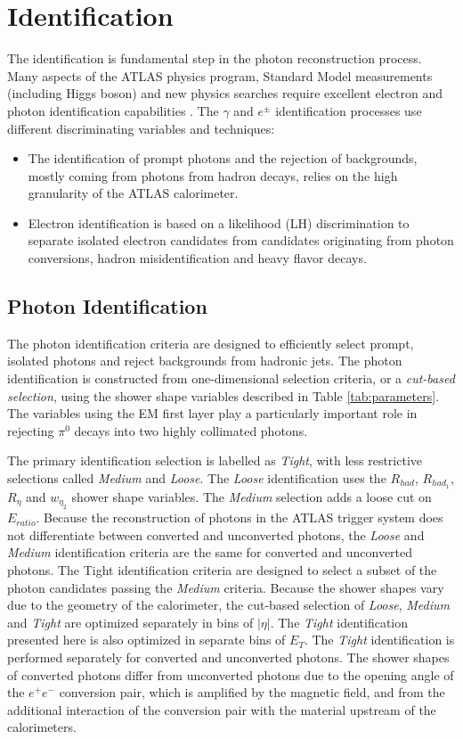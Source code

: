\documentclass[a4paper, oneside, 11pt, openright]{book}
\begin{document}
		\section{Identification}\label{section:Ident}
			The identification is fundamental step in the photon reconstruction process. Many aspects of the ATLAS physics program, Standard Model measurements (including Higgs boson) and new physics searches require excellent electron and photon identification capabilities \cite{el_id}\cite{ph_id}. The $\gamma$ and $e^\pm$ identification processes use different discriminating variables and techniques:
			\begin{itemize}
				\item The identification of prompt photons and the rejection of backgrounds, mostly coming from photons from hadron decays, relies on the high granularity of the ATLAS calorimeter.
				\item  Electron identification is based on a likelihood (LH) discrimination to separate isolated electron candidates from candidates originating from photon conversions, hadron misidentification and heavy flavor decays.
			\end{itemize}
			
			\subsection{Photon Identification}
				The photon identification criteria \cite{Aad_2019} are designed to efficiently select prompt, isolated photons and reject backgrounds from hadronic jets. The photon identification is constructed from one-dimensional selection criteria, or a \textit{cut-based selection}, using the shower shape variables described in Table \ref{tab:parameters}. The variables using the EM first layer play a particularly important role in rejecting $\pi^0$ decays into two highly collimated photons. 
				
				The primary identification selection is labelled as \textit{Tight}, with less restrictive selections called \textit{Medium} and \textit{Loose}. The \textit{Loose} identification uses the $R_{had}$, $R_{had_1}$, $R_{\eta}$ and $w_{\eta_2}$ shower shape variables. The \textit{Medium} selection adds a loose cut on $E_{ratio}$. Because the reconstruction of photons in the ATLAS trigger system does not differentiate between converted and unconverted photons, the \textit{Loose} and \textit{Medium} identification criteria are the same for converted and unconverted photons. The Tight identification criteria are designed to select a subset of the photon candidates passing the \textit{Medium} criteria. Because the shower shapes vary due to the geometry of the calorimeter, the cut-based selection of \textit{Loose}, \textit{Medium} and \textit{Tight} are optimized separately in bins of $|\eta|$. The \textit{Tight} identification presented here is also optimized in separate bins of $E_T$. The \textit{Tight} identification is performed separately for converted and unconverted photons. The shower shapes of converted photons differ from unconverted photons due to the opening angle of the $e^+e^-$ conversion pair, which is amplified by the magnetic field, and from the additional interaction of the conversion pair with the material upstream of the calorimeters.
				
\end{document}
